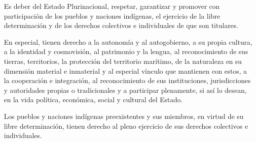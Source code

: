 \documentclass[11pt, a4paper]{article}
\begin{document}
\begin{enumerate}
Es deber del Estado Plurinacional, respetar, garantizar y promover con participación de los pueblos y naciones indígenas, el ejercicio de la libre determinación y de los derechos colectivos e individuales de que son titulares. 

En especial, tienen derecho a la autonomía y al autogobierno, a su propia cultura, a la identidad y cosmovisión, al patrimonio y la lengua, al reconocimiento de sus tierras, territorios, la protección del territorio marítimo, de la naturaleza en su dimensión material e inmaterial y al especial vínculo que mantienen con estos, a la cooperación e integración, al reconocimiento de sus instituciones, jurisdicciones y autoridades propias o tradicionales y a participar plenamente, si así lo desean, en la vida política, económica, social y cultural del Estado. 

Los pueblos y naciones indígenas preexistentes y sus miembros, en virtud de su libre determinación, tienen derecho al pleno ejercicio de sus derechos colectivos e individuales. 



\end{enumerate}
\end{document}
